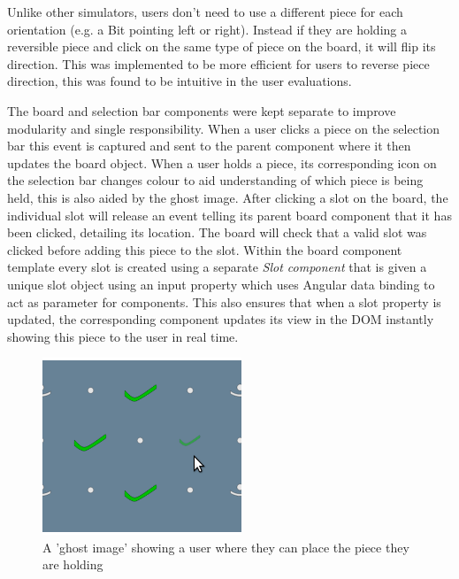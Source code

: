 \documentclass{l4proj}
\begin{document}
Unlike other simulators, users don't need to use a different piece for each orientation (e.g. a Bit pointing left or right). Instead if they are holding a reversible piece and click on the same type of piece on the board, it will flip its direction. This was implemented to be more efficient for users to reverse piece direction, this was found to be intuitive in the user evaluations. 

The board and selection bar components were kept separate to improve modularity and single responsibility. When a user clicks a piece on the selection bar this event is captured and sent to the parent component where it then updates the board object. When a user holds a piece, its corresponding icon on the selection bar changes colour to aid understanding of which piece is being held, this is also aided by the ghost image. After clicking a slot on the board, the individual slot will release an event telling its parent board component that it has been clicked, detailing its location. The board will check that a valid slot was clicked before adding this piece to the slot. Within the board component template every slot is created using a separate \emph{Slot component} that is given a unique slot object using an input property which uses Angular data binding to act as parameter for components. This also ensures that when a slot property is updated, the corresponding component updates its view in the DOM instantly showing this piece to the user in real time.



\begin{figure}
    \centering
    \includegraphics[width=0.4\linewidth]{images/ghostImage.png}
    \caption{A 'ghost image' showing a user where they can place the piece they are holding}
    \label{fig:ghostPiece}
\end{figure}
\end{document}

